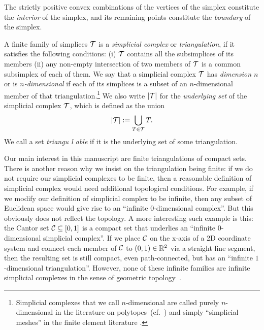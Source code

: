 \documentclass[10pt,letterpaper]{article}
\newcommand\cye[1]{%
  \protect\leavevmode
  \begingroup
    \color{red!35!yellow}%
    #1%
  \endgroup
}
\begin{document}
The strictly positive convex combinations of the vertices of the simplex constitute the \textit{ interior} of the simplex,
and its remaining points constitute the \textit{boundary} of the simplex.

A finite family of simplices ${\mathcal T}$ is a \emph{simplicial complex} or \emph{triangulation}, if it satisfies the following conditions: 
(i) ${\mathcal T}$ contains all the subsimplices of its members (ii) any non-empty intersection of two members of ${\mathcal T}$ is a common subsimplex of each of them. 
We say that a simplicial complex ${\mathcal T}$ has \textit{dimension $n$} or is \textit{$n$-dimensional} if each of its simplices is a subset of an $n$-dimensional member of that triangulation.\footnote{Simplicial complexes that we call $n$-dimensional are called purely $n$-dimensional in the literature on polytopes~(cf.\ \cite{ziegler1995lectures}) \cye{and simply ``simplicial meshes'' in the finite element literature}.} 
We also write $\left| {\mathcal T} \right|$ for the \textit{underlying set} of the simplicial complex ${\mathcal T}$, which is defined as the union 
\begin{align*}
    \left| {\mathcal T} \right| := \bigcup_{ T \in {\mathcal T} } T
    .
\end{align*}
We call a set \textit{triangu\cye{l}able} if it is the underlying set of some triangulation. 


\begin{remark}
    Our main interest in this manuscript are finite triangulations of compact sets. 
    There is another reason why we insist on the triangulation being finite: 
    if we do not require our simplicial complexes to be finite,
    then a reasonable definition of simplicial complex would need additional topological conditions. 
    For example, if we modify our definition of simplicial complex to be infinite, 
    then any subset of Euclidean space would give rise to an ``infinite $0$-dimensional complex''. But this obviously does not reflect the topology. 
    A more interesting such example is this:
    the Cantor set ${\mathcal C} \subseteq [0,1]$ is a compact set 
    that underlies an ``infinite $0$-dimensional simplicial complex''.
    If we place ${\mathcal C}$ on the x-axis of a 2D coordinate system 
    and connect each member of ${\mathcal C}$ to $(0,1) \in {\mathbb R}^{2}$ via a straight line segment, 
    then the resulting set is still compact, even path-connected,  
    but has an ``infinite $1$-dimensional triangulation''.
    However, none of these infinite families are infinite simplicial complexes in the sense of geometric topology~\cite{lee2011topological}. 
\end{remark}
\end{document}
